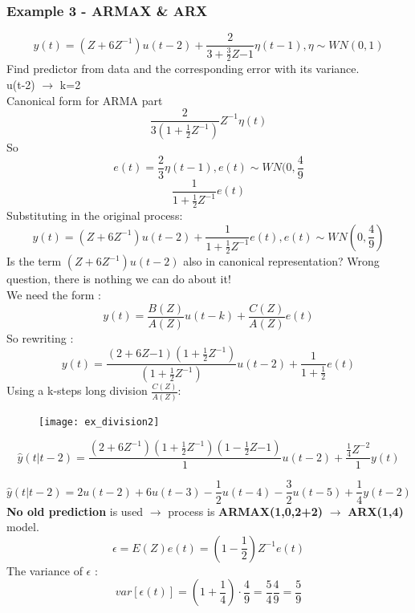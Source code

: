 \begin{itemize}
\subsubsection{Example 3 - ARMAX \& ARX}
$$ y(t) = (Z+6Z^{-1})u(t-2) + \frac{2}{3+\frac{3}{2}Z{-1}}\eta(t-1) , \eta \sim WN(0,1)$$
Find predictor from data and the corresponding error with its variance.\\
u(t-2) $\to$ k=2\\
Canonical form for ARMA part\\
$$ \frac{2}{3(1+\frac{1}{2}Z^{-1})}Z^{-1}\eta(t)$$
So $$ e(t) = \frac{2}{3} \eta(t-1) , e(t) \sim WN(0,\frac{4}{9}$$
$$ \frac{1}{1+\frac{1}{2}Z^{-1}}e(t)$$
Substituting in the original process:
$$ y(t) = (Z+6Z^{-1})u(t-2) +  \frac{1}{1+\frac{1}{2}Z^{-1}}e(t), e(t) \sim WN(0,\frac{4}{9})$$
Is the term $(Z+6Z^{-1})u(t-2)$ also in canonical representation? Wrong question, there is nothing we can do about it!\\
We need the form : $$ y(t) = \frac{B(Z)}{A(Z)}u(t-k) + \frac{C(Z)}{A(Z)}e(t)$$
So rewriting :
$$ y(t) =\frac{(2+6Z{-1})(1+\frac{1}{2}Z^{-1})}{(1+\frac{1}{2}Z^{-1})}u(t-2)+ \frac{1}{1+\frac{1}{2}}e(t)$$
Using a k-steps long division $\frac{C(Z)}{A(Z)}$:
\begin{figure}[H]
 \centering
  \texttt{[image: ex\_division2]}
\end{figure}
\end{itemize}
$$ \hat{y}(t|t-2) = \frac{(2+6Z^{-1})(1+\frac{1}{2}Z^{-1})(1-\frac{1}{2}Z{-1})}{1}u(t-2)+ \frac{\frac{1}{4}Z^{-2}}{1} y(t)$$

\[
\boxed{\hat{y}(t|t-2) = 2u(t-2)+6u(t-3)-\frac{1}{2}u(t-4)-\frac{3}{2}u(t-5)+\frac{1}{4}y(t-2)}
\]
\textbf{No old prediction} is used $\to$ process is \textbf{ARMAX(1,0,2+2)} $\to$ \textbf{ARX(1,4)} model.
\[
\boxed{\epsilon=E(Z)e(t)=(1-\frac{1}{2})Z^{-1}e(t)}
\]
The variance of $\epsilon$ :
$$ var[\epsilon(t)]= (1+\frac{1}{4})\cdot \frac{4}{9} = \frac{5}{4}\frac{4}{9}= \frac{5}{9}$$


